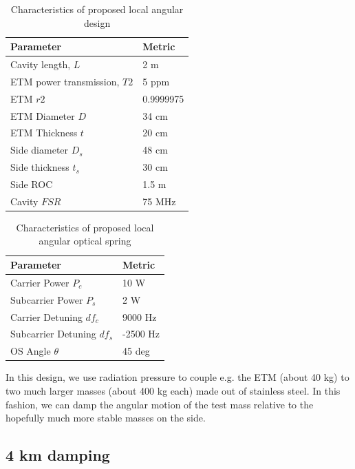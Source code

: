 \begin{table}[htp]
\centering
\begin{tabular}{ l | l | }
\bf{Parameter}& \bf{Metric}  \\ \hline
Cavity length, $L$ & 2 m \\ \hline
ETM power transmission, $T2$ & 5 ppm \\ \hline
ETM $r2$ &0.9999975 \\ \hline
ETM Diameter $D$ & 34 cm \\ \hline
ETM Thickness $t$ & 20 cm \\ \hline
Side diameter $D_s$ & 48 cm \\ \hline
Side thickness $t_s$ & 30 cm \\ \hline
Side ROC & 1.5 m \\ \hline
Cavity $FSR$ & 75 MHz \\ \hline

\end{tabular}
\caption[Local angular design]{Characteristics of proposed local angular design}
\label{tab:localproposal}
\end{table}

\begin{table}[htp]
\centering
\begin{tabular}{ l | l | }
\bf{Parameter}& \bf{Metric}  \\ \hline
Carrier Power $P_c$ & 10 W \\ \hline
Subcarrier Power $P_s$ & 2 W \\ \hline
Carrier Detuning $df_c$ & 9000 Hz \\ \hline
Subcarrier Detuning $df_s$ & -2500 Hz \\ \hline
OS Angle $\theta$ & 45 deg \\ \hline
\end{tabular}
\caption[Local angular optical springs]{Characteristics of proposed local angular optical spring}
\label{tab:localos}
\end{table}

In this design, we use radiation pressure to couple e.g. the ETM (about 40 kg) to two much larger masses (about 400 kg each) made out of stainless steel. In this fashion, we can damp the angular motion of the test mass relative to the hopefully much more stable masses on the side. 

\subsection{4 km damping}

